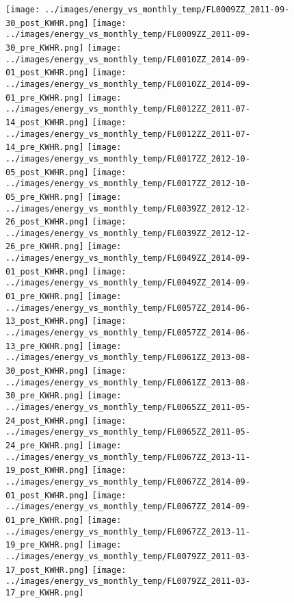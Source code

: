 \clearpage
\begin{figure}
\centering
\texttt{[image: ../images/energy\_vs\_monthly\_temp/FL0009ZZ\_2011-09-30\_post\_KWHR.png]}
\texttt{[image: ../images/energy\_vs\_monthly\_temp/FL0009ZZ\_2011-09-30\_pre\_KWHR.png]}
\texttt{[image: ../images/energy\_vs\_monthly\_temp/FL0010ZZ\_2014-09-01\_post\_KWHR.png]}
\texttt{[image: ../images/energy\_vs\_monthly\_temp/FL0010ZZ\_2014-09-01\_pre\_KWHR.png]}
\texttt{[image: ../images/energy\_vs\_monthly\_temp/FL0012ZZ\_2011-07-14\_post\_KWHR.png]}
\texttt{[image: ../images/energy\_vs\_monthly\_temp/FL0012ZZ\_2011-07-14\_pre\_KWHR.png]}
\texttt{[image: ../images/energy\_vs\_monthly\_temp/FL0017ZZ\_2012-10-05\_post\_KWHR.png]}
\texttt{[image: ../images/energy\_vs\_monthly\_temp/FL0017ZZ\_2012-10-05\_pre\_KWHR.png]}
\texttt{[image: ../images/energy\_vs\_monthly\_temp/FL0039ZZ\_2012-12-26\_post\_KWHR.png]}
\texttt{[image: ../images/energy\_vs\_monthly\_temp/FL0039ZZ\_2012-12-26\_pre\_KWHR.png]}
\texttt{[image: ../images/energy\_vs\_monthly\_temp/FL0049ZZ\_2014-09-01\_post\_KWHR.png]}
\texttt{[image: ../images/energy\_vs\_monthly\_temp/FL0049ZZ\_2014-09-01\_pre\_KWHR.png]}
\texttt{[image: ../images/energy\_vs\_monthly\_temp/FL0057ZZ\_2014-06-13\_post\_KWHR.png]}
\texttt{[image: ../images/energy\_vs\_monthly\_temp/FL0057ZZ\_2014-06-13\_pre\_KWHR.png]}
\texttt{[image: ../images/energy\_vs\_monthly\_temp/FL0061ZZ\_2013-08-30\_post\_KWHR.png]}
\texttt{[image: ../images/energy\_vs\_monthly\_temp/FL0061ZZ\_2013-08-30\_pre\_KWHR.png]}
\texttt{[image: ../images/energy\_vs\_monthly\_temp/FL0065ZZ\_2011-05-24\_post\_KWHR.png]}
\texttt{[image: ../images/energy\_vs\_monthly\_temp/FL0065ZZ\_2011-05-24\_pre\_KWHR.png]}
\texttt{[image: ../images/energy\_vs\_monthly\_temp/FL0067ZZ\_2013-11-19\_post\_KWHR.png]}
\texttt{[image: ../images/energy\_vs\_monthly\_temp/FL0067ZZ\_2014-09-01\_post\_KWHR.png]}
\texttt{[image: ../images/energy\_vs\_monthly\_temp/FL0067ZZ\_2014-09-01\_pre\_KWHR.png]}
\texttt{[image: ../images/energy\_vs\_monthly\_temp/FL0067ZZ\_2013-11-19\_pre\_KWHR.png]}
\texttt{[image: ../images/energy\_vs\_monthly\_temp/FL0079ZZ\_2011-03-17\_post\_KWHR.png]}
\texttt{[image: ../images/energy\_vs\_monthly\_temp/FL0079ZZ\_2011-03-17\_pre\_KWHR.png]}
\end{figure}
